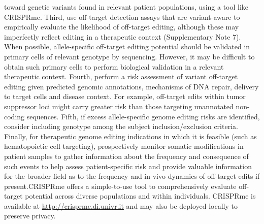 \documentclass[a4paper, titlepage, openright]{book}
\newcommand{\crisprme}{CRISPRme\xspace}
\begin{document}
toward genetic variants found in relevant patient populations, using a tool like \crisprme \citep{cancellieri2023human}. Third, use off-target detection assays that are variant-aware to empirically evaluate the likelihood of off-target editing, although these may imperfectly reflect editing in a therapeutic context (Supplementary Note 7). When possible, allele-specific off-target editing potential should be validated in primary cells of relevant genotype by sequencing. However, it may be difficult to obtain such primary cells to perform biological validation in a relevant therapeutic context. Fourth, perform a risk assessment of variant off-target editing given predicted genomic annotations, mechanisms of DNA repair, delivery to target cells and disease context. For example, off-target edits within tumor suppressor loci might carry greater risk than those targeting unannotated non-coding sequences. Fifth, if excess allele-specific genome editing risks are identified, consider including genotype among the subject inclusion/exclusion criteria. Finally, for therapeutic genome editing indications in which it is feasible (such as hematopoietic cell targeting), prospectively monitor somatic modifications in patient samples to gather information about the frequency and consequence of such events to help assess patient-specific risk and provide valuable information for the broader field as to the frequency and in vivo dynamics of off-target edits if present.\crisprme offers a simple-to-use tool to comprehensively evaluate off-target potential across diverse populations and within individuals. \crisprme is available at \url{http://crisprme.di.univr.it} and may also be deployed locally to preserve privacy.
\end{document}
